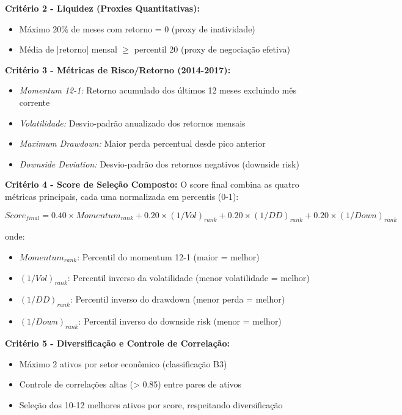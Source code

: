 \textbf{Critério 2 - Liquidez (Proxies Quantitativas):}
\begin{itemize}
    \item Máximo 20\% de meses com retorno = 0 (proxy de inatividade)
    \item Média de |retorno| mensal $\geq$ percentil 20 (proxy de negociação efetiva)
\end{itemize}

\textbf{Critério 3 - Métricas de Risco/Retorno (2014-2017):}
\begin{itemize}
    \item \textit{Momentum 12-1:} Retorno acumulado dos últimos 12 meses excluindo mês corrente
    \item \textit{Volatilidade:} Desvio-padrão anualizado dos retornos mensais
    \item \textit{Maximum Drawdown:} Maior perda percentual desde pico anterior
    \item \textit{Downside Deviation:} Desvio-padrão dos retornos negativos (downside risk)
\end{itemize}

\textbf{Critério 4 - Score de Seleção Composto:}
O score final combina as quatro métricas principais, cada uma normalizada em percentis (0-1):

\begin{equation}
Score_{final} = 0.40 \times Momentum_{rank} + 0.20 \times (1/Vol)_{rank} + 0.20 \times (1/DD)_{rank} + 0.20 \times (1/Down)_{rank}
\end{equation}

onde:
\begin{itemize}
    \item $Momentum_{rank}$: Percentil do momentum 12-1 (maior = melhor)
    \item $(1/Vol)_{rank}$: Percentil inverso da volatilidade (menor volatilidade = melhor)
    \item $(1/DD)_{rank}$: Percentil inverso do drawdown (menor perda = melhor)  
    \item $(1/Down)_{rank}$: Percentil inverso do downside risk (menor = melhor)
\end{itemize}

\textbf{Critério 5 - Diversificação e Controle de Correlação:}
\begin{itemize}
    \item Máximo 2 ativos por setor econômico (classificação B3)
    \item Controle de correlações altas (> 0.85) entre pares de ativos
    \item Seleção dos 10-12 melhores ativos por score, respeitando diversificação
\end{itemize}

